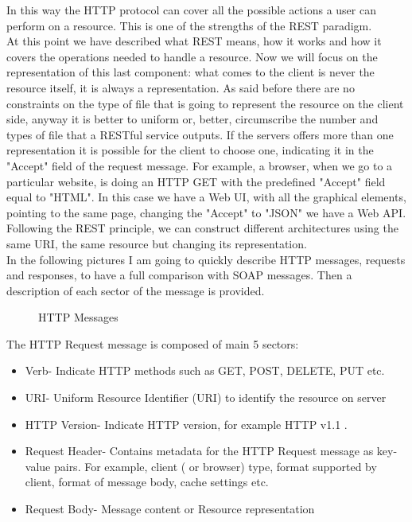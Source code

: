 In this way the HTTP protocol can cover all the possible actions a user can perform on a resource. This is one of the strengths of the REST paradigm. \\
At this point we have described what REST means, how it works and how it covers the operations needed to handle a resource. Now we will focus on the representation of this last component: what comes to the client is never the resource itself, it is always a representation. As said before there are no constraints on the type of file that is going to represent the resource on the client side, anyway it is better to uniform or, better, circumscribe the number and types of file that a RESTful service outputs. If the servers offers more than one representation it is possible for the client to choose one, indicating it in the "Accept" field of the request message. For example, a browser, when we go to a particular website, is doing an HTTP GET with the predefined "Accept" field equal to "HTML". In this case we have a Web UI, with all the graphical elements, pointing to the same page, changing the "Accept" to "JSON" we have a Web API. Following the REST principle, we can construct different architectures using the same URI, the same resource but changing its representation.\\
In the following pictures I am going to quickly describe HTTP messages, requests and responses, to have a full comparison with SOAP messages. Then a description of each sector of the message is provided.

\begin{figure}[h]
\centering
{}\quad
{}
\caption{HTTP Messages}
\label{4.2:httpmessages}
\end{figure}

The HTTP Request message is composed of main 5 sectors:
\begin{itemize}

	\item Verb- Indicate HTTP methods such as GET, POST, DELETE, PUT etc.

	\item URI- Uniform Resource Identifier (URI) to identify the resource on server

	\item HTTP Version- Indicate HTTP version, for example HTTP v1.1 .

	\item Request Header- Contains metadata for the HTTP Request message as key-value pairs. For example, client ( or browser) type, format supported by client, format of message body, cache settings etc.

	\item Request Body- Message content or Resource representation	
	
\end{itemize}

